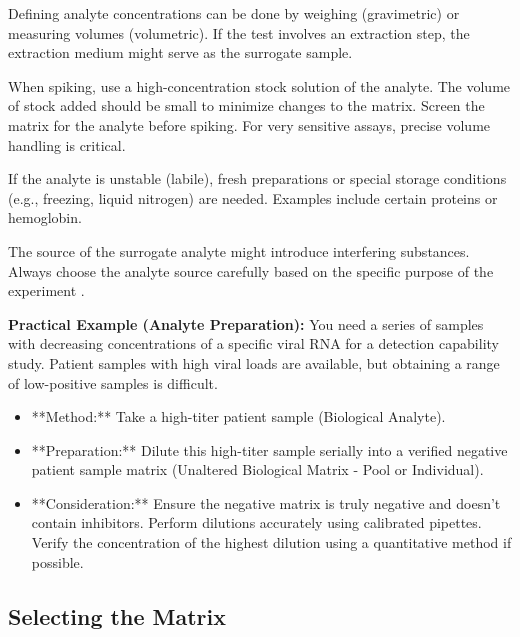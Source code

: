 \documentclass{article}
\begin{document}
Defining analyte concentrations can be done by weighing (gravimetric) or measuring volumes (volumetric). If the test involves an extraction step, the extraction medium might serve as the surrogate sample.

When spiking, use a high-concentration stock solution of the analyte. The volume of stock added should be small to minimize changes to the matrix. Screen the matrix for the analyte before spiking. For very sensitive assays, precise volume handling is critical.

If the analyte is unstable (labile), fresh preparations or special storage conditions (e.g., freezing, liquid nitrogen) are needed. Examples include certain proteins or hemoglobin.

The source of the surrogate analyte might introduce interfering substances. Always choose the analyte source carefully based on the specific purpose of the experiment \cite{CLSIEP37}.

\textbf{Practical Example (Analyte Preparation):}
You need a series of samples with decreasing concentrations of a specific viral RNA for a detection capability study. Patient samples with high viral loads are available, but obtaining a range of low-positive samples is difficult.
\begin{itemize}
    \item **Method:** Take a high-titer patient sample (Biological Analyte).
    \item **Preparation:** Dilute this high-titer sample serially into a verified negative patient sample matrix (Unaltered Biological Matrix - Pool or Individual).
    \item **Consideration:** Ensure the negative matrix is truly negative and doesn't contain inhibitors. Perform dilutions accurately using calibrated pipettes. Verify the concentration of the highest dilution using a quantitative method if possible.
\end{itemize}

\subsection{Selecting the Matrix}
\end{document}
